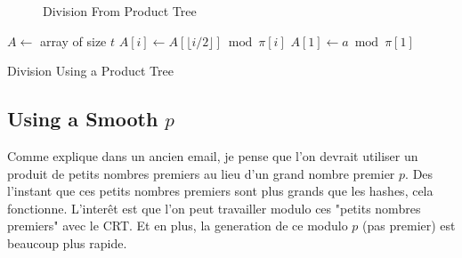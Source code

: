 \documentclass[11pt]{llncs}
\newcommand{\Oapp}{\ensuremath{\tilde{O}}}
\begin{document}
\begin{figure}[t]
{\begin{turn}{90}
\end{turn}}
\caption{Division From Product Tree}\label{fig:div-prod-tree}
\end{figure}

\newpage

\begin{algorithm}
\newcommand{\vstart}{\ensuremath{\mathrm{start}}}
\newcommand{\vmid}{\ensuremath{\mathrm{mid}}}
\newcommand{\vend}{\ensuremath{\mathrm{end}}}
\begin{algorithmic}[1]
\State $A \gets $ array of size $t$
    \State $A[i] \gets A[\lfloor i/2 \rfloor] \bmod \pi[i]$
    \State {}
    \State {}
  \EndIf
\EndFunction
\State $A[1] \gets a \bmod \pi[1]$
\State {}
\State {}
\end{algorithmic}
\caption{Division Using a Product Tree}\label{alg:div-prod-tree}
\end{algorithm}

\subsection{Using a Smooth $p$}

Comme explique dans un ancien email, je pense que l'on devrait utiliser un produit de petits nombres premiers au lieu d'un grand nombre premier $p$. Des l'instant que ces petits nombres premiers sont plus grands que les hashes, cela fonctionne. L'interêt est que l'on peut travailler modulo ces "petits nombres premiers" avec le CRT. Et en plus, la generation de ce modulo $p$ (pas premier) est beaucoup plus rapide.
\end{document}
